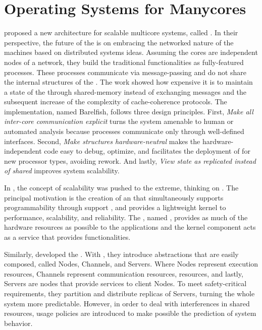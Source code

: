 \section{Operating Systems for Manycores}
\label{sec.works.os}

	 proposed a new \os architecture for scalable multicore
	systems, called \multikernel.
	In their perspective, the future of the \oss is on embracing the networked nature
	of the machines based on distributed systems ideas.
	Assuming the cores are independent nodes of a network, they build the traditional
	\os functionalities as fully-featured processes.
	These processes communicate via message-passing and do not share the internal
	structures of the \os.
	The work showed how expensive it is to maintain a state of the \os through
	shared-memory instead of exchanging messages and the subsequent increase of
	the complexity of cache-coherence protocols.
	The \multikernel implementation, named Barelfish, follows three design principles.
	First, \textit{Make all inter-core communication explicit} turns the system
	amenable to human or automated analysis because processes communicate only
	through well-defined interfaces.
	Second, \textit{Make \os structures hardware-neutral} makes the hardware-independent
	code easy to debug, optimize, and facilitates the deployment of \os for new
	processor types, avoiding rework.
	And lastly, \textit{View \os state as replicated instead of shared} improves system
	scalability.

	In , the concept of scalability was pushed
	to the extreme, thinking on \hpc.
	The principal motivation is the creation of an \os that simultaneously supports
	programmability through support \linux \api, and provides a lightweight kernel
	to performance, scalability, and reliability.
	The \os, named \mos, provides as much of the hardware resources as
	possible to the \hpc applications and the \linux kernel component
	acts as a service that provides \linux functionalities.

	Similarly,  developed the \moosca.
	With \moosca, they introduce abstractions that are easily composed, called Nodes,
	Channels, and Servers.
	Where Nodes represent execution resources, Channels represent communication
	resources, \eg \noc resources, and lastly, Servers are nodes that provide
	services to client Nodes.
	To meet safety-critical requirements, they partition \manycore and distribute
	replicas of Servers, turning the whole system more predictable.
	However, in order to deal with interferences in shared resources,
	usage policies are introduced to make possible the prediction of system behavior.

